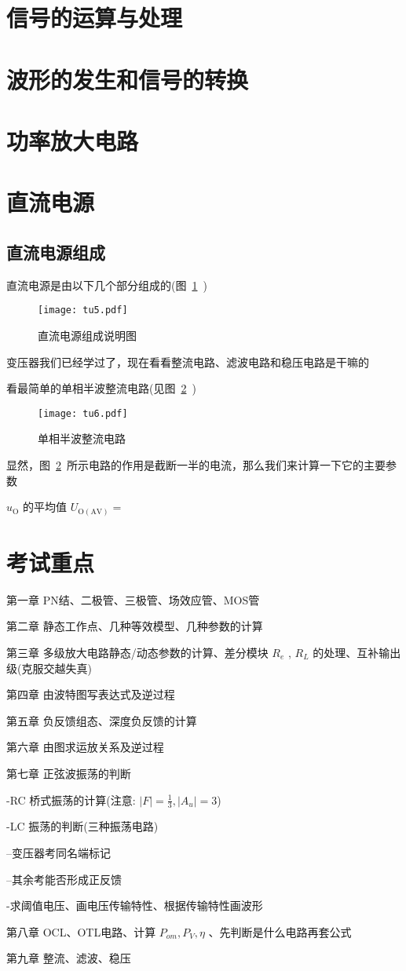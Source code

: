\documentclass[cn,pad,11pt,geye]{elegantnote}
\begin{document}
\section{信号的运算与处理}
\section{波形的发生和信号的转换}
\section{功率放大电路}
\section{直流电源}
\subsection{直流电源组成}
	直流电源是由以下几个部分组成的(图~\ref{tu:5}~)
	\begin{figure}[htbp]
		\centering
		\texttt{[image: tu5.pdf]}
		\caption{直流电源组成说明图}\label{tu:5}
	\end{figure}
	变压器我们已经学过了，现在看看整流电路、滤波电路和稳压电路是干嘛的

	看最简单的单相半波整流电路(见图~\ref{tu:6}~)
	\begin{figure}[htbp]
		\centering
		\texttt{[image: tu6.pdf]}
		\caption{单相半波整流电路}\label{tu:6}
	\end{figure}

	显然，图~\ref{tu:6}~所示电路的作用是截断一半的电流，那么我们来计算一下它的主要参数

	$u_{\mathrm{O}}$ 的平均值 $U_{\mathrm{O(AV)}}=$
\section{考试重点}
第一章 PN结、二极管、三极管、场效应管、MOS管

第二章 静态工作点、几种等效模型、几种参数的计算

第三章 多级放大电路静态/动态参数的计算、差分模块 $R_e$ , $R_L$ 的处理、互补输出级(克服交越失真)

第四章 由波特图写表达式及逆过程

第五章 负反馈组态、深度负反馈的计算

第六章 由图求运放关系及逆过程

第七章 正弦波振荡的判断

-RC 桥式振荡的计算(注意: $|F|=\frac{1}{3},|A_u|=3$)

-LC 振荡的判断(三种振荡电路)

--变压器考同名端标记

--其余考能否形成正反馈

-求阈值电压、画电压传输特性、根据传输特性画波形

第八章 OCL、OTL电路、计算 $P_{om},P_{V},\eta$ 、先判断是什么电路再套公式

第九章 整流、滤波、稳压
\end{document}
